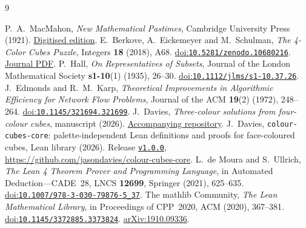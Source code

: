 \documentclass[11pt]{article}
\theoremstyle{remark}
\begin{document}
\begin{thebibliography}{9}
\raggedright
{} P.~A.~MacMahon,
\emph{New Mathematical Pastimes}, Cambridge University Press (1921).
\href{https://archive.org/details/newmathematicalp00macmuoft}{Digitised edition}.
 E.~Berkove, A.~Eickemeyer and M.~Schulman,
\emph{The 4-Color Cubes Puzzle}, Integers \textbf{18} (2018), A68.
\href{https://doi.org/10.5281/zenodo.10680216}{doi:\nolinkurl{10.5281/zenodo.10680216}}.
\href{https://math.colgate.edu/~integers/s68/s68.pdf}{Journal PDF}.
 P.~Hall, \emph{On Representatives of Subsets},
Journal of the London Mathematical Society \textbf{s1-10}(1) (1935), 26--30.
\href{https://doi.org/10.1112/jlms/s1-10.37.26}{doi:\nolinkurl{10.1112/jlms/s1-10.37.26}}.
 J.~Edmonds and R.~M.~Karp,
\emph{Theoretical Improvements in Algorithmic Efficiency for Network Flow Problems},
Journal of the ACM \textbf{19}(2) (1972), 248--264.
\href{https://doi.org/10.1145/321694.321699}{doi:\nolinkurl{10.1145/321694.321699}}.
 J.~Davies,
\emph{Three-colour solutions from four-colour cubes}, manuscript (2026).
\href{https://github.com/jasondavies/four-to-three-colour-cubes}{Accompanying repository}.
 J.~Davies,
\texttt{colour-\allowbreak cubes-\allowbreak core}: palette-independent Lean definitions and proofs
for face-coloured cubes, Lean library (2026).
Release \href{https://github.com/jasondavies/colour-cubes-core/tree/v1.0.0}{\texttt{v1.0.0}},
\url{https://github.com/jasondavies/colour-cubes-core}.
 L.~de Moura and S.~Ullrich,
\emph{The Lean 4 Theorem Prover and Programming Language},
in Automated Deduction---CADE~28, LNCS \textbf{12699}, Springer (2021), 625--635.
\href{https://doi.org/10.1007/978-3-030-79876-5_37}{doi:\nolinkurl{10.1007/978-3-030-79876-5_37}}.
 The mathlib Community, \emph{The Lean Mathematical Library},
in Proceedings of CPP~2020, ACM (2020), 367--381.
\href{https://doi.org/10.1145/3372885.3373824}{doi:\nolinkurl{10.1145/3372885.3373824}}.
\href{https://arxiv.org/abs/1910.09336}{arXiv:1910.09336}.
\end{thebibliography}
\end{document}
